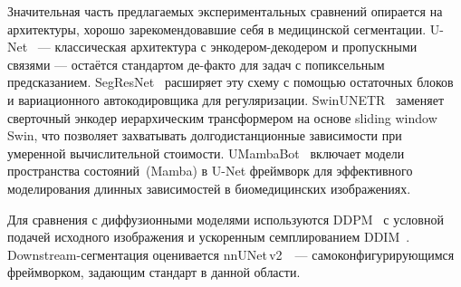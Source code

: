 Значительная часть предлагаемых экспериментальных сравнений опирается на архитектуры, хорошо зарекомендовавшие себя в медицинской сегментации. U-Net~\cite{ronneberger2015u} --- классическая архитектура с энкодером-декодером и пропускными связями --- остаётся стандартом де-факто для задач с попиксельным предсказанием. SegResNet~\cite{myronenko20183d} расширяет эту схему с помощью остаточных блоков и вариационного автокодировщика для регуляризации. SwinUNETR~\cite{hatamizadeh2021swin} заменяет сверточный энкодер иерархическим трансформером на основе sliding window Swin, что позволяет захватывать долгодистанционные зависимости при умеренной вычислительной стоимости. UMambaBot~\cite{ma2024u} включает модели пространства состояний~(Mamba) в U-Net фреймворк для эффективного моделирования длинных зависимостей в биомедицинских изображениях.

Для сравнения с диффузионными моделями используются DDPM~\cite{ho2020denoising} с условной подачей исходного изображения и ускоренным семплированием DDIM~\cite{song2020denoising}. Downstream-сегментация оценивается nnUNet\,v2~\cite{isensee2024nnu}~--- самоконфигурирующимся фреймворком, задающим стандарт в данной области.
